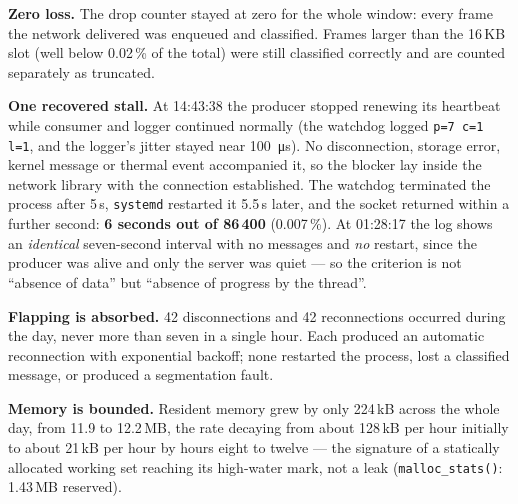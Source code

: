 \documentclass[11pt,a4paper]{article}
\newcommand{\code}[1]{\texttt{\small #1}}
\begin{document}
\textbf{Zero loss.} The drop counter stayed at zero for the whole window: every frame
the network delivered was enqueued and classified. Frames larger than the 16\,KB slot
(well below 0.02\,\% of the total) were still classified correctly and are counted
separately as truncated.

\textbf{One recovered stall.} At 14:43:38 the producer stopped renewing its heartbeat
while consumer and logger continued normally (the watchdog logged \code{p=7 c=1 l=1},
and the logger's jitter stayed near \SI{100}{\micro\second}). No disconnection, storage
error, kernel message or thermal event accompanied it, so the blocker lay inside the
network library with the connection established. The watchdog terminated the process
after 5\,s, \code{systemd} restarted it 5.5\,s later, and the socket returned within a
further second: \textbf{6 seconds out of 86\,400} (0.007\,\%). At 01:28:17 the log shows
an \emph{identical} seven-second interval with no messages and \emph{no} restart, since
the producer was alive and only the server was quiet --- so the criterion is not
``absence of data'' but ``absence of progress by the thread''.

\textbf{Flapping is absorbed.} 42 disconnections and 42 reconnections occurred during
the day, never more than seven in a single hour. Each produced an automatic reconnection
with exponential backoff; none restarted the process, lost a classified message, or
produced a segmentation fault.

\textbf{Memory is bounded.} Resident memory grew by only 224\,kB across the whole day, from
11.9 to 12.2\,MB, the rate decaying from about 128\,kB per hour initially to about 21\,kB
per hour by hours eight to twelve --- the signature of a statically allocated working set
reaching its high-water mark, not a leak (\code{malloc\_stats()}: 1.43\,MB reserved).
\end{document}
